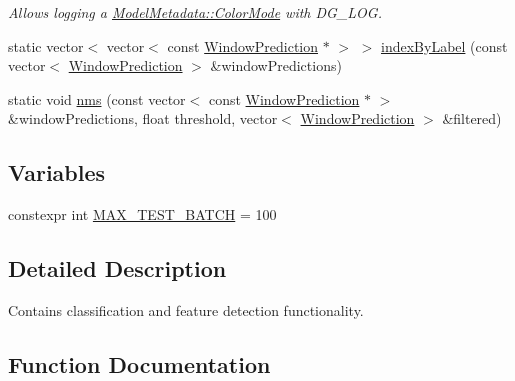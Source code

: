\begin{DoxyCompactItemize}
\begin{DoxyCompactList}\small\item\em Allows logging a \hyperlink{group___classification_module_gafa8e703c3646c5f93ada56f3c811aac7}{Model\+Metadata\+::\+Color\+Mode} with D\+G\+\_\+\+L\+OG. \end{DoxyCompactList}\item 
static vector$<$ vector$<$ const \hyperlink{structdg_1_1deepcore_1_1classification_1_1_window_prediction}{Window\+Prediction} $\ast$ $>$ $>$ \hyperlink{namespacedg_1_1deepcore_1_1classification_a35bbb1bc49ff748a106cc46510a8c605}{index\+By\+Label} (const vector$<$ \hyperlink{structdg_1_1deepcore_1_1classification_1_1_window_prediction}{Window\+Prediction} $>$ \&window\+Predictions)
\item 
static void \hyperlink{namespacedg_1_1deepcore_1_1classification_aad018c85056765ac4163143920b17cdc}{nms} (const vector$<$ const \hyperlink{structdg_1_1deepcore_1_1classification_1_1_window_prediction}{Window\+Prediction} $\ast$ $>$ \&window\+Predictions, float threshold, vector$<$ \hyperlink{structdg_1_1deepcore_1_1classification_1_1_window_prediction}{Window\+Prediction} $>$ \&filtered)
\end{DoxyCompactItemize}
\subsection*{Variables}
\begin{DoxyCompactItemize}
\item 
constexpr int \hyperlink{namespacedg_1_1deepcore_1_1classification_aa446ed99e9dde48dda8f883367797b68}{M\+A\+X\+\_\+\+T\+E\+S\+T\+\_\+\+B\+A\+T\+CH} = 100
\end{DoxyCompactItemize}


\subsection{Detailed Description}
Contains classification and feature detection functionality. 

\subsection{Function Documentation}
